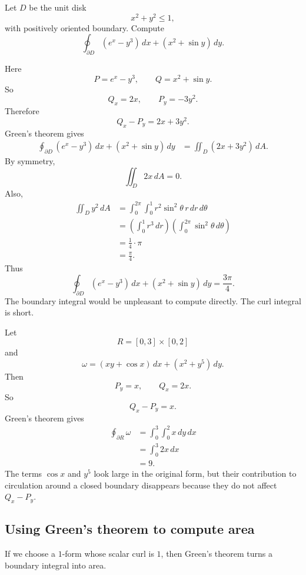 \begin{example}
Let \(D\) be the unit disk
\[
    x^2+y^2\le1,
\]
with positively oriented boundary.  Compute
\[
    \oint_{\partial D}(e^x-y^3)\,dx+(x^2+\sin y)\,dy.
\]

Here
\[
    P=e^x-y^3,
    \qquad
    Q=x^2+\sin y.
\]
So
\[
    Q_x=2x,
    \qquad
    P_y=-3y^2.
\]
Therefore
\[
    Q_x-P_y=2x+3y^2.
\]
Green's theorem gives
\[
\begin{aligned}
\oint_{\partial D}(e^x-y^3)\,dx+(x^2+\sin y)\,dy
&=
\iint_D(2x+3y^2)\,dA.
\end{aligned}
\]
By symmetry,
\[
    \iint_D 2x\,dA=0.
\]
Also,
\[
\begin{aligned}
\iint_D y^2\,dA
&=
\int_0^{2\pi}\int_0^1 r^2\sin^2\theta\,r\,dr\,d\theta\\
&=
\left(\int_0^1 r^3\,dr\right)
  \left(\int_0^{2\pi}\sin^2\theta\,d\theta\right)\\
&=
\frac14\cdot\pi\\
&=
\frac\pi4.
\end{aligned}
\]
Thus
\[
\boxed{
    \oint_{\partial D}(e^x-y^3)\,dx+(x^2+\sin y)\,dy
    =
    \frac{3\pi}{4}.
}
\]
The boundary integral would be unpleasant to compute directly.  The curl integral is
short.
\end{example}

\begin{example}
Let
\[
    R=[0,3]\times[0,2]
\]
and
\[
    \omega=(xy+\cos x)\,dx+(x^2+y^5)\,dy.
\]
Then
\[
    P_y=x,
    \qquad
    Q_x=2x.
\]
So
\[
    Q_x-P_y=x.
\]
Green's theorem gives
\[
\begin{aligned}
\oint_{\partial R}\omega
&=
\int_0^3\int_0^2 x\,dy\,dx\\
&=
\int_0^3 2x\,dx\\
&=9.
\end{aligned}
\]
The terms \(\cos x\) and \(y^5\) look large in the original form, but their contribution
to circulation around a closed boundary disappears because they do not affect
\(Q_x-P_y\).
\end{example}

\subsection{Using Green's theorem to compute area}

If we choose a \(1\)-form whose scalar curl is \(1\), then Green's theorem turns a
boundary integral into area.

